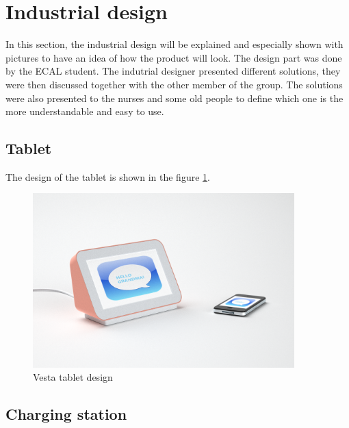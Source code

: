 \section{Industrial design}

In this section, the industrial design will be explained and especially shown with pictures to have an idea of how the product will look. The design part was done by the ECAL student. The indutrial designer presented different solutions, they were then discussed together with the other member of the group. The solutions were also presented to the nurses and some old people to define which one is the more understandable and easy to use.

\subsection{Tablet}


The design of the tablet is shown in the figure \ref{fig:vesta design}.

\begin{figure}[!htb]
    \centering
    \includegraphics[width=0.9\textwidth,keepaspectratio]{chap/designFig/VestaRender4.png}
    \caption{Vesta tablet design}
    \label{fig:vesta design}
\end{figure}


\subsection{Charging station}

